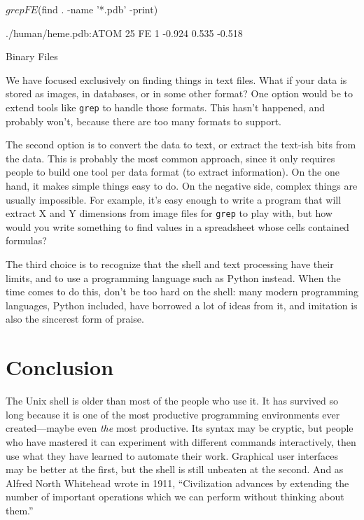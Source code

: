\begin{VerbIn}
$ grep FE $(find . -name '*.pdb' -print)
\end{VerbIn}

\begin{VerbOut}
./human/heme.pdb:ATOM  25  FE  1  -0.924  0.535  -0.518
\end{VerbOut}

\begin{swcbox}{Binary Files}

We have focused exclusively on finding things in text files. What if
your data is stored as images, in databases, or in some other format?
One option would be to extend tools like \texttt{grep} to handle those
formats. This hasn't happened, and probably won't, because there are too
many formats to support.

The second option is to convert the data to text, or extract the
text-ish bits from the data. This is probably the most common approach,
since it only requires people to build one tool per data format (to
extract information). On the one hand, it makes simple things easy to
do. On the negative side, complex things are usually impossible. For
example, it's easy enough to write a program that will extract X and Y
dimensions from image files for \texttt{grep} to play with, but how
would you write something to find values in a spreadsheet whose cells
contained formulas?

The third choice is to recognize that the shell and text processing have
their limits, and to use a programming language such as Python instead.
When the time comes to do this, don't be too hard on the shell: many
modern programming languages, Python included, have borrowed a lot of
ideas from it, and imitation is also the sincerest form of praise.

\end{swcbox}

\section{Conclusion}

The Unix shell is older than most of the people who use it. It has
survived so long because it is one of the most productive programming
environments ever created---maybe even \emph{the} most productive. Its
syntax may be cryptic, but people who have mastered it can experiment
with different commands interactively, then use what they have learned
to automate their work. Graphical user interfaces may be better at the
first, but the shell is still unbeaten at the second. And as Alfred
North Whitehead wrote in 1911, ``Civilization advances by extending the
number of important operations which we can perform without thinking
about them.''


